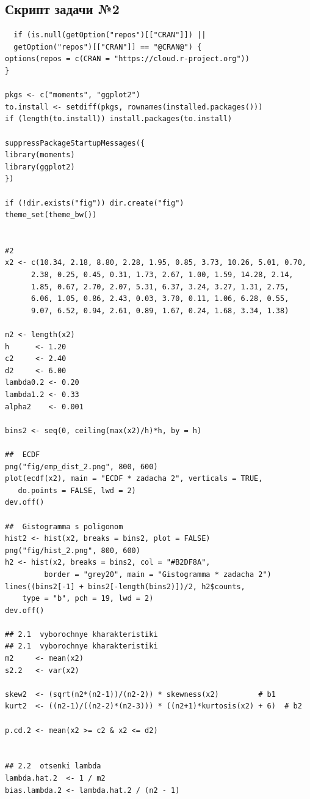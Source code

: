 \documentclass[areasetadvanced]{scrartcl}
\begin{document}
\subsection*{Скрипт задачи №2}
\begin{lstlisting}
  if (is.null(getOption("repos")[["CRAN"]]) ||
  getOption("repos")[["CRAN"]] == "@CRAN@") {
options(repos = c(CRAN = "https://cloud.r-project.org"))
}

pkgs <- c("moments", "ggplot2")
to.install <- setdiff(pkgs, rownames(installed.packages()))
if (length(to.install)) install.packages(to.install)

suppressPackageStartupMessages({
library(moments)
library(ggplot2)
})

if (!dir.exists("fig")) dir.create("fig")
theme_set(theme_bw())


#2
x2 <- c(10.34, 2.18, 8.80, 2.28, 1.95, 0.85, 3.73, 10.26, 5.01, 0.70,
      2.38, 0.25, 0.45, 0.31, 1.73, 2.67, 1.00, 1.59, 14.28, 2.14,
      1.85, 0.67, 2.70, 2.07, 5.31, 6.37, 3.24, 3.27, 1.31, 2.75,
      6.06, 1.05, 0.86, 2.43, 0.03, 3.70, 0.11, 1.06, 6.28, 0.55,
      9.07, 6.52, 0.94, 2.61, 0.89, 1.67, 0.24, 1.68, 3.34, 1.38)

n2 <- length(x2)
h      <- 1.20
c2     <- 2.40
d2     <- 6.00
lambda0.2 <- 0.20
lambda1.2 <- 0.33
alpha2    <- 0.001

bins2 <- seq(0, ceiling(max(x2)/h)*h, by = h)

##  ECDF
png("fig/emp_dist_2.png", 800, 600)
plot(ecdf(x2), main = "ECDF * zadacha 2", verticals = TRUE,
   do.points = FALSE, lwd = 2)
dev.off()

##  Gistogramma s poligonom
hist2 <- hist(x2, breaks = bins2, plot = FALSE)
png("fig/hist_2.png", 800, 600)
h2 <- hist(x2, breaks = bins2, col = "#B2DF8A",
         border = "grey20", main = "Gistogramma * zadacha 2")
lines((bins2[-1] + bins2[-length(bins2)])/2, h2$counts,
    type = "b", pch = 19, lwd = 2)
dev.off()

## 2.1  vyborochnye kharakteristiki 
## 2.1  vyborochnye kharakteristiki 
m2     <- mean(x2)
s2.2   <- var(x2)

skew2  <- (sqrt(n2*(n2-1))/(n2-2)) * skewness(x2)         # b1
kurt2  <- ((n2-1)/((n2-2)*(n2-3))) * ((n2+1)*kurtosis(x2) + 6)  # b2

p.cd.2 <- mean(x2 >= c2 & x2 <= d2)


## 2.2  otsenki lambda 
lambda.hat.2  <- 1 / m2
bias.lambda.2 <- lambda.hat.2 / (n2 - 1)


\end{lstlisting}
\end{document}
